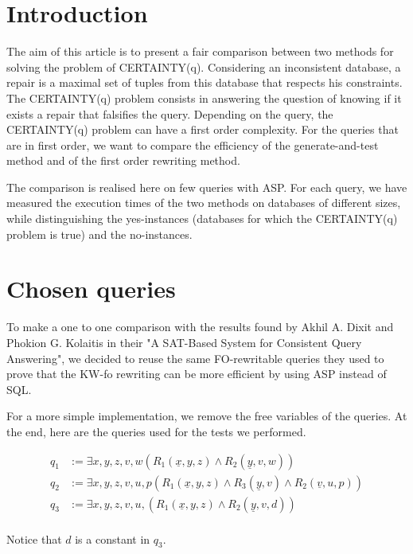
\section{Introduction}
The aim of this article is to present a fair comparison between two methods for
solving the problem of CERTAINTY(q). Considering an inconsistent database, a
repair is a maximal set of tuples from this database that respects his
constraints. The CERTAINTY(q) problem consists in answering the question of
knowing if it exists a repair that falsifies the query. Depending on the query,
the CERTAINTY(q) problem can have a first order complexity. For the queries
that are in first order, we want to compare the efficiency of the
generate-and-test method and of the first order rewriting method.

The comparison is realised here on few queries with ASP. For each query, we
have measured the execution times of the two methods on databases of different
sizes, while distinguishing the yes-instances (databases for which the
CERTAINTY(q) problem is true) and the no-instances.




\section{Chosen queries}

To make a one to one comparison with the results found by Akhil A. Dixit and Phokion G. Kolaitis in their "A SAT-Based System for Consistent Query
Answering", we decided to reuse the same FO-rewritable queries they used to
prove that the KW-fo rewriting can be more efficient by using ASP instead of
SQL.

For a more simple implementation, we remove the free variables of the queries. At
the end, here are the queries used for the tests we performed.

\begin{align*}
q_1 &:= \exists x, y, z, v, w (R_1(\underline{x},y,z) \wedge R_2(\underline{y}, v, w))\\
q_2 &:= \exists x, y, z, v, u, p (R_1(\underline{x},y,z) \wedge R_3(\underline{y}, v) \wedge R_2(\underline{v}, u, p)) \\
q_3 &:= \exists x, y, z, v, u, (R_1(\underline{x},y,z) \wedge R_2(\underline{y}, v, d)) \\
\end{align*}

Notice that $d$ is a constant in $q_3$.
